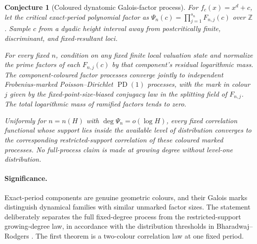 \documentclass[11pt]{article}
\newtheorem{conjecture}{Conjecture}
\newcommand{\PD}{\operatorname{PD}}
\newcommand{\Z}{\mathbb Z}
\begin{document}
\begin{conjecture}[Coloured dynatomic Galois-factor process]\label{c18}
For $f_c(x)=x^d+c$, let the critical exact-period polynomial factor as
$\Psi_n(c)=\prod_{j=1}^{s_n}F_{n,j}(c)$ over $\Z$.  Sample $c$ from a dyadic height
interval away from postcritically finite, discriminant, and fixed-resultant loci.

For every fixed $n$, condition on any fixed finite local valuation state and normalize
the prime factors of each $F_{n,j}(c)$ by that component's residual logarithmic mass.
The component-coloured factor processes converge jointly to independent
Frobenius-marked Poisson--Dirichlet $\PD(1)$ processes, with the mark in colour $j$ given by the
fixed-point-size-biased conjugacy law in the splitting field of $F_{n,j}$.  The total
logarithmic mass of ramified factors tends to zero.

Uniformly for $n=n(H)$ with $\deg\Psi_n=o(\log H)$, every fixed correlation functional
whose support lies inside the available level of distribution converges to the
corresponding restricted-support correlation of these coloured marked processes.  No
full-process claim is made at growing degree without level-one distribution.
\end{conjecture}

\paragraph{Significance.}
Exact-period components are genuine geometric colours, and their Galois marks distinguish
dynamical families with similar unmarked factor sizes.  The statement deliberately
separates the full fixed-degree process from the restricted-support growing-degree law,
in accordance with the distribution thresholds in Bharadwaj--Rodgers \cite{BR}.  The
first theorem is a two-colour correlation law at one fixed period.
\end{document}

